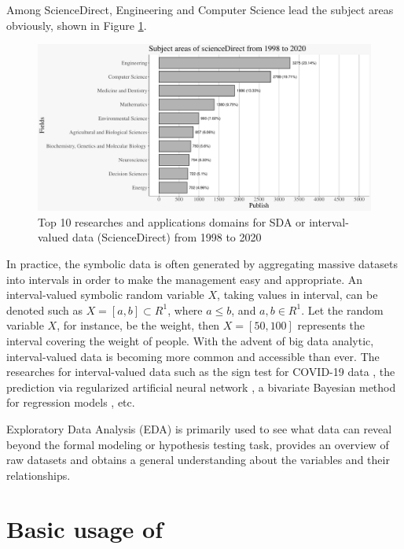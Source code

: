 \documentclass[article]{jss}
\newcommand{\imgdir}{../../../paperImage/}
\begin{document}
Among ScienceDirect, Engineering and Computer Science lead the subject areas obviously, shown in Figure \ref{fig:subjectAreas}.

\begin{figure}[htbp]	
  		\centering	 			 	 
\includegraphics{ggESDA_Jiang&Wu_20210915-subjectFig}
  		\caption{Top 10 researches and applications domains for SDA or interval-valued data (ScienceDirect) from 1998 to 2020} 
  		\label{fig:subjectAreas}   			 		 
\end{figure}


In practice, the symbolic data is often generated by aggregating massive datasets into intervals in order to make the management easy and appropriate. An interval-valued symbolic random variable $X$, taking values in interval, can be denoted such as $X = [a,b] \subset  R^{1}$, where $a \leq b$, and $a, b \in R^{1}$. Let the random variable $X$, for instance, be the weight, then $X = [50,100]$ represents the interval covering the weight of people. With the advent of big data analytic, interval-valued data is becoming more common and accessible than ever. The researches for interval-valued data such as the sign test for COVID-19 data \cite{sherwani:2021}, the prediction via regularized artificial neural network \cite{yang:2019}, a bivariate Bayesian method for regression models \cite{xu:2021}, etc.

Exploratory Data Analysis (EDA) \cite{Tukey:1977} is primarily used to see what data can reveal beyond the formal modeling or hypothesis testing task, provides an overview of raw datasets and obtains a general understanding about the variables and their relationships.




\section[Basic usage of ggESDA]{Basic usage of }
\end{document}
